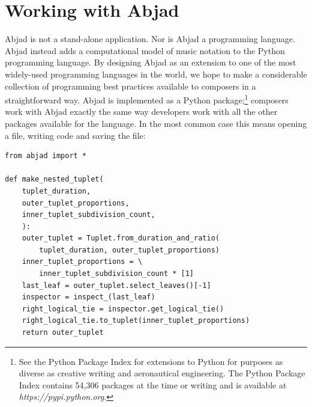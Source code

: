 \documentclass{article}
\begin{document}
\section{Working with Abjad} \label{sec:example}

Abjad is not a stand-alone application. Nor is Abjad a programming language.
Abjad instead adds a computational model of music notation to the Python programming language.
By designing Abjad as an extension to one of the most widely-used programming languages in the world, we hope to make a considerable collection of programming best practices available to composers in a straightforward way. Abjad is implemented as a Python package;\footnote{See the Python Package Index for extensions to Python for purposes as diverse as creative writing and aeronautical engineering. The Python Package Index contains 54,306 packages at the time or writing and is available at \textit{https://pypi.python.org}.} composers work with Abjad exactly the same way developers work with all the other packages available for the language. In the most common case this means opening a file, writing code and saving the file:

\begin{lstlisting}
from abjad import *

def make_nested_tuplet(
    tuplet_duration,
    outer_tuplet_proportions,
    inner_tuplet_subdivision_count,
    ):
    outer_tuplet = Tuplet.from_duration_and_ratio(
        tuplet_duration, outer_tuplet_proportions)
    inner_tuplet_proportions = \
        inner_tuplet_subdivision_count * [1]
    last_leaf = outer_tuplet.select_leaves()[-1]
    inspector = inspect_(last_leaf)
    right_logical_tie = inspector.get_logical_tie()
    right_logical_tie.to_tuplet(inner_tuplet_proportions)
    return outer_tuplet
\end{lstlisting}
\end{document}
